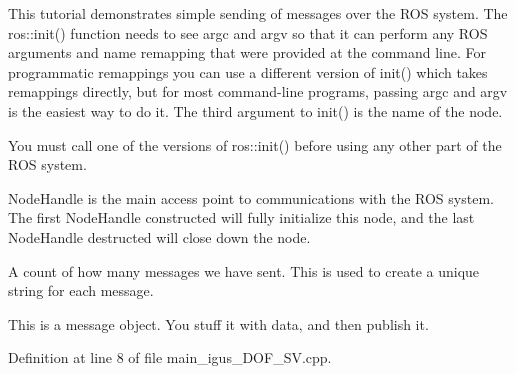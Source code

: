 This tutorial demonstrates simple sending of messages over the R\+OS system. The ros\+::init() function needs to see argc and argv so that it can perform any R\+OS arguments and name remapping that were provided at the command line. For programmatic remappings you can use a different version of init() which takes remappings directly, but for most command-\/line programs, passing argc and argv is the easiest way to do it. The third argument to init() is the name of the node.

You must call one of the versions of ros\+::init() before using any other part of the R\+OS system.

Node\+Handle is the main access point to communications with the R\+OS system. The first Node\+Handle constructed will fully initialize this node, and the last Node\+Handle destructed will close down the node.

A count of how many messages we have sent. This is used to create a unique string for each message.

This is a message object. You stuff it with data, and then publish it.

Definition at line 8 of file main\+\_\+igus\+\_\+D\+O\+F\+\_\+\+S\+V.\+cpp.

